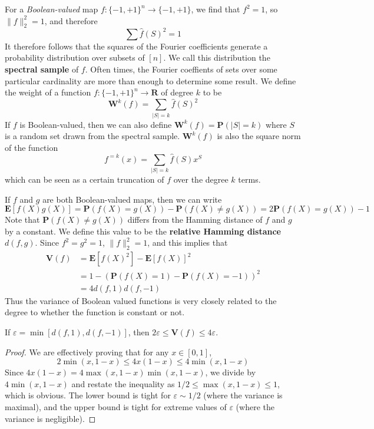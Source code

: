 For a {\it Boolean-valued} map $f: \{ -1, +1 \}^n \to \{ -1, +1 \}$, we find that $f^2 = 1$, so $\| f \|_2^2 = 1$, and therefore
%
\[ \sum \widehat{f}(S)^2 = 1 \]
%
It therefore follows that the squares of the Fourier coefficients generate a probability distribution over subsets of $[n]$. We call this distribution the {\bf spectral sample} of $f$. Often times, the Fourier coeffients of sets over some particular cardinality are more than enough to determine some result. We define the weight of a function $f: \{ -1, +1 \}^n \to \mathbf{R}$ of degree $k$ to be
%
\[ \mathbf{W}^k(f) = \sum_{|S| = k} \widehat{f}(S)^2 \]
%
If $f$ is Boolean-valued, then we can also define $\mathbf{W}^k(f) = \mathbf{P}(|S| = k)$ where $S$ is a random set drawn from the spectral sample. $\mathbf{W}^k(f)$ is also the square norm of the function
%
\[ f^{=k}(x) = \sum_{|S| = k} \widehat{f}(S) x^S \]
%
which can be seen as a certain truncation of $f$ over the degree $k$ terms.

If $f$ and $g$ are both Boolean-valued maps, then we can write
%
\[ \mathbf{E}[f(X)g(X)] = \mathbf{P}(f(X) = g(X)) - \mathbf{P}(f(X) \neq g(X)) = 2\mathbf{P}(f(X) = g(X)) - 1 \]
%
Note that $\mathbf{P}(f(X) \neq g(X))$ differs from the Hamming distance of $f$ and $g$ by a constant. We define this value to be the {\bf relative Hamming distance} $d(f,g)$. Since $f^2 = g^2 = 1$, $\| f \|_2^2 = 1$, and this implies that
%
\begin{align*}
    \mathbf{V}(f) &= \mathbf{E}[f(X)^2] - \mathbf{E}[f(X)]^2\\
    &= 1 - (\mathbf{P}(f(X) = 1) - \mathbf{P}(f(X) = -1))^2\\
    &= 4d(f,1)d(f,-1)
\end{align*}
%
Thus the variance of Boolean valued functions is very closely related to the degree to whether the function is constant or not.

\begin{lemma}
    If $\varepsilon = \min[d(f,1),d(f,-1)]$, then $2\varepsilon \leq \mathbf{V}(f) \leq 4\varepsilon$.
\end{lemma}
\begin{proof}
    We are effectively proving that for any $x \in [0,1]$,
    \[ 2\min(x,1-x) \leq 4x(1-x) \leq 4\min(x,1-x) \]
    Since $4x(1-x) = 4\max(x,1-x)\min(x,1-x)$, we divide by $4\min(x,1-x)$ and restate the inequality as $1/2 \leq \max(x,1-x) \leq 1$, which is obvious. The lower bound is tight for $\varepsilon \sim 1/2$ (where the variance is maximal), and the upper bound is tight for extreme values of $\varepsilon$ (where the variance is negligible).
\end{proof}

